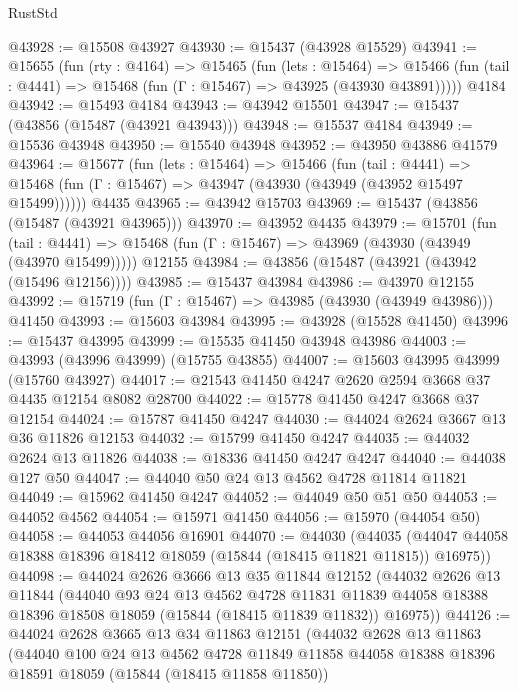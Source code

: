 \begin{lexlean}{RustStd}
\begin{coremodule}
@43928 := @15508 @43927
@43930 := @15437 (@43928 @15529)
@43941 := @15655
    (fun (rty : @4164) =>
    @15465
      (fun (lets : @15464) =>
      @15466 (fun (tail : @4441) => @15468 (fun (Γ : @15467) => @43925 (@43930 @43891)))))
    @4184
@43942 := @15493 @4184
@43943 := @43942 @15501
@43947 := @15437 (@43856 (@15487 (@43921 @43943)))
@43948 := @15537 @4184
@43949 := @15536 @43948
@43950 := @15540 @43948
@43952 := @43950 @43886 @41579
@43964 := @15677
    (fun (lets : @15464) =>
    @15466
      (fun (tail : @4441) =>
      @15468 (fun (Γ : @15467) => @43947 (@43930 (@43949 (@43952 @15497 @15499))))))
    @4435
@43965 := @43942 @15703
@43969 := @15437 (@43856 (@15487 (@43921 @43965)))
@43970 := @43952 @4435
@43979 := @15701
    (fun (tail : @4441) => @15468 (fun (Γ : @15467) => @43969 (@43930 (@43949 (@43970 @15499)))))
    @12155
@43984 := @43856 (@15487 (@43921 (@43942 (@15496 @12156))))
@43985 := @15437 @43984
@43986 := @43970 @12155
@43992 := @15719 (fun (Γ : @15467) => @43985 (@43930 (@43949 @43986))) @41450
@43993 := @15603 @43984
@43995 := @43928 (@15528 @41450)
@43996 := @15437 @43995
@43999 := @15535 @41450 @43948 @43986
@44003 := @43993 (@43996 @43999) (@15755 @43855)
@44007 := @15603 @43995 @43999 (@15760 @43927)
@44017 := @21543 @41450 @4247 @2620 @2594 @3668 @37 @4435 @12154 @8082 @28700
@44022 := @15778 @41450 @4247 @3668 @37 @12154
@44024 := @15787 @41450 @4247
@44030 := @44024 @2624 @3667 @13 @36 @11826 @12153
@44032 := @15799 @41450 @4247
@44035 := @44032 @2624 @13 @11826
@44038 := @18336 @41450 @4247 @4247
@44040 := @44038 @127 @50
@44047 := @44040 @50 @24 @13 @4562 @4728 @11814 @11821
@44049 := @15962 @41450 @4247
@44052 := @44049 @50 @51 @50
@44053 := @44052 @4562
@44054 := @15971 @41450
@44056 := @15970 (@44054 @50)
@44058 := @44053 @44056 @16901
@44070 := @44030
    (@44035 (@44047 @44058 @18388 @18396 @18412 @18059 (@15844 (@18415 @11821 @11815)) @16975))
@44098 := @44024
    @2626
    @3666
    @13
    @35
    @11844
    @12152
    (@44032
      @2626
      @13
      @11844
      (@44040
        @93
        @24
        @13
        @4562
        @4728
        @11831
        @11839
        @44058
        @18388
        @18396
        @18508
        @18059
        (@15844 (@18415 @11839 @11832))
        @16975))
@44126 := @44024
    @2628
    @3665
    @13
    @34
    @11863
    @12151
    (@44032
      @2628
      @13
      @11863
      (@44040
        @100
        @24
        @13
        @4562
        @4728
        @11849
        @11858
        @44058
        @18388
        @18396
        @18591
        @18059
        (@15844 (@18415 @11858 @11850))

\end{coremodule}
\end{lexlean}
